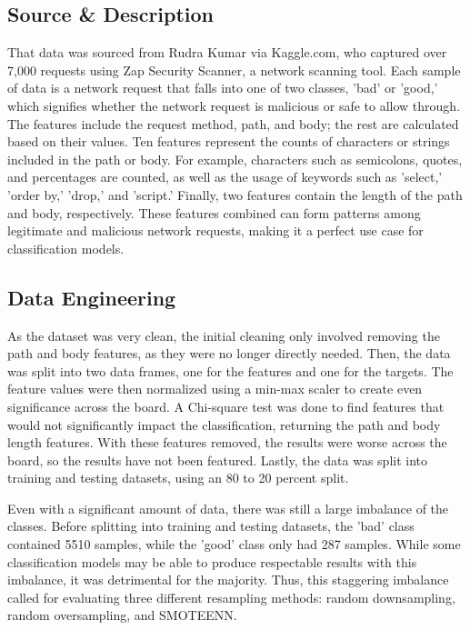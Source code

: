 \documentclass[conference]{IEEEtran}
\begin{document}
    \subsection{Source \& Description}
    That data was sourced from Rudra Kumar via Kaggle.com\cite{KumarKaggle}, who captured over 7,000 requests using Zap Security Scanner\cite{zap}, a network scanning tool. Each sample of data is a network request that falls into one of two classes, 'bad' or 'good,' which signifies whether the network request is malicious or safe to allow through. The features include the request method, path, and body; the rest are calculated based on their values. Ten features represent the counts of characters or strings included in the path or body. For example, characters such as semicolons, quotes, and percentages are counted, as well as the usage of keywords such as 'select,' 'order by,' 'drop,' and 'script.' Finally, two features contain the length of the path and body, respectively. These features combined can form patterns among legitimate and malicious network requests, making it a perfect use case for classification models.

    \subsection{Data Engineering}
    As the dataset was very clean, the initial cleaning only involved removing the path and body features, as they were no longer directly needed. Then, the data was split into two data frames, one for the features and one for the targets. The feature values were then normalized using a min-max scaler to create even significance across the board. A Chi-square test was done to find features that would not significantly impact the classification, returning the path and body length features. With these features removed, the results were worse across the board, so the results have not been featured. Lastly, the data was split into training and testing datasets, using an 80 to 20 percent split.

    Even with a significant amount of data, there was still a large imbalance of the classes. Before splitting into training and testing datasets, the 'bad' class contained 5510 samples, while the 'good' class only had 287 samples. While some classification models may be able to produce respectable results with this imbalance, it was detrimental for the majority. Thus, this staggering imbalance called for evaluating three different resampling methods: random downsampling, random oversampling, and SMOTEENN.
\end{document}
